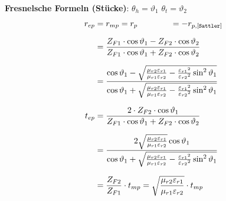 \textbf{Fresnelsche Formeln (Stücke)}: \qquad $ \theta_h = \vartheta_{1} $ \quad $ \theta_t = \vartheta_{2} $
\begin{equation*}
	\setlength{\jot}{10pt}
	\begin{aligned}
		r_{ep} & =  r_{mp} = r_{p}  \qquad \qquad =-r_{p,[\texttt{Sattler}]}                                                                                                                                                                                                                                                                                  \\
		       & = \frac{Z_{F1} \cdot \cos \vartheta_1-Z_{F2} \cdot \cos \vartheta_2}{Z_{F1} \cdot \cos \vartheta_1+Z_{F2} \cdot \cos \vartheta_2}                                                                                                                                                                                                            \\
		       & =\frac{\cos \vartheta_1-\sqrt{\frac{\mu_{r 2} \varepsilon_{r 1}}{\mu_{r 1} \varepsilon_{r 2}}-\frac{\varepsilon_{r 1}{ }^2}{\varepsilon_{r 2}{ }^2} \sin ^2 \vartheta_1}}{\cos \vartheta_1+\sqrt{\frac{\mu_{r 2} \varepsilon_{r 1}}{\mu_{r 1} \varepsilon_{r 2}}-\frac{\varepsilon_{r 1}{ }^2}{\varepsilon_{r 2}{} ^2} \sin ^2 \vartheta_1}} \\
		t_{ep} & =  \frac{2 \cdot Z_{F2}   \cdot  \cos \vartheta_1}{Z_{F1} \cdot \cos \vartheta_1+Z_{F2} \cdot \cos \vartheta_2}                                                                                                                                                                                                                              \\                                                                                                                           %
		       & =\frac{2 \sqrt{\frac{\mu_{r 2} \varepsilon_{r 1}}{\mu_{r 1} \varepsilon_{r 2}}} \cos \vartheta_1}{\cos \vartheta_1+\sqrt{\frac{\mu_{r 2} \varepsilon_{r 1}}{\mu_{r 1} \varepsilon_{r 2}}-\frac{\varepsilon_{r 1}{ }^2}{\varepsilon_{r 2}{ }^2} \sin ^2 \vartheta_1}}                                                                         \\
		       & = \frac{Z_{F2}}{Z_{F1}}\cdot t_{mp} = \sqrt{\frac{\mu_{r2}\varepsilon_{r1}}{\mu_{r1}\varepsilon_{r2}}}\cdot t_{mp}                                                                                                                                                                                                                           \\

\end{aligned}
\end{equation*}
